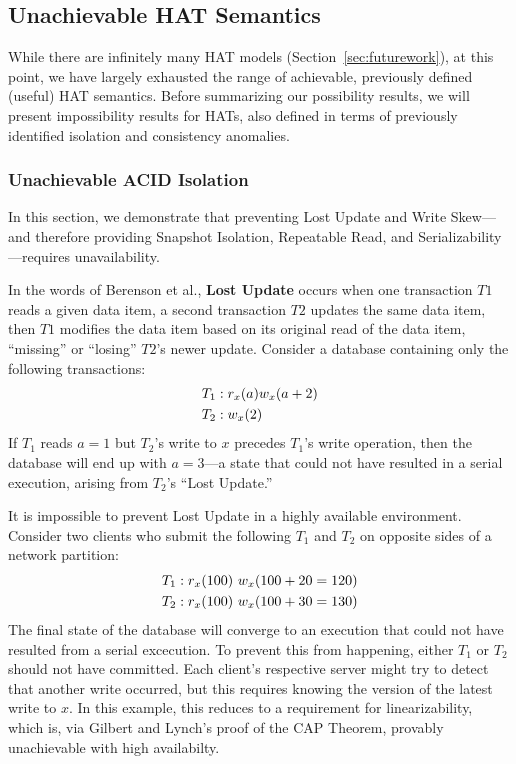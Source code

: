 \subsection{Unachievable HAT Semantics}
\label{sec:unachievable-hat}

While there are infinitely many HAT models
(Section~\ref{sec:futurework}), at this point, we have largely
exhausted the range of achievable, previously defined (useful) HAT
semantics. Before summarizing our possibility results, we will present
impossibility results for HATs, also defined in terms of previously
identified isolation and consistency anomalies.

\subsubsection{Unachievable ACID Isolation}

In this section, we demonstrate that preventing Lost Update and Write
Skew---and therefore providing Snapshot Isolation, Repeatable Read,
and Serializability---requires unavailability.

In the words of Berenson et al., \textbf{Lost Update} occurs when one
transaction $T1$ reads a given data item, a second transaction $T2$
updates the same data item, then $T1$ modifies the data item based on
its original read of the data item, ``missing'' or ``losing'' $T2$'s
newer update. Consider a database containing only the following
transactions:
\begin{align*}
\small
T_1 &: r_x(a) w_x(a+2)
\\T_2 &: w_x(2)
\end{align*}
If $T_1$ reads $a=1$ but $T_2$'s write to $x$ precedes $T_1$'s write
operation, then the database will end up with $a=3$---a state that
could not have resulted in a serial execution, arising from $T_2$'s
``Lost Update.''

It is impossible to prevent Lost Update in a highly available
environment. Consider two clients who submit the following $T_1$ and
$T_2$ on opposite sides of a network partition:
\begin{align*}
\small
T_1 &: r_x(100)~w_x(100+20=120)
\\T_2 &: r_x(100)~w_x(100+30=130)
\end{align*}
The final state of the database will converge to an execution that
could not have resulted from a serial excecution. To prevent this from
happening, either $T_1$ or $T_2$ should not have committed. Each
client's respective server might try to detect that another write
occurred, but this requires knowing the version of the latest write to
$x$. In this example, this reduces to a requirement for
linearizability, which is, via Gilbert and Lynch's proof of the CAP
Theorem, provably unachievable with high availabilty.

